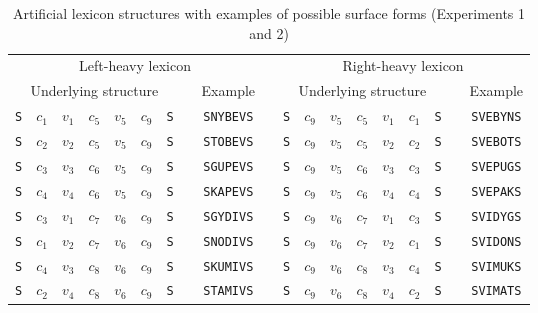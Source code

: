 \documentclass[doc,biblatex]{apa7}
\begin{document}
\begin{table}
\begin{center}
\begin{threeparttable}
\caption{Artificial lexicon structures with examples of possible surface forms (Experiments 1 and 2)}
\footnotesize
\label{table1}
\begin{tabular}{ccccccccccccccccccc}
\toprule
\multicolumn{9}{c}{Left-heavy lexicon} & & \multicolumn{9}{c}{Right-heavy lexicon} \\
\multicolumn{7}{c}{Underlying structure} & & Example & & \multicolumn{7}{c}{Underlying structure} & & Example \\
\texttt{S} & $c_1$ & $v_1$ & $c_5$ & $v_5$ & $c_9$ & \texttt{S} & & \texttt{SNYBEVS} & & \texttt{S} & $c_9$ & $v_5$ & $c_5$ & $v_1$ & $c_1$ & \texttt{S} & & \texttt{SVEBYNS} \\
\texttt{S} & $c_2$ & $v_2$ & $c_5$ & $v_5$ & $c_9$ & \texttt{S} & & \texttt{STOBEVS} & & \texttt{S} & $c_9$ & $v_5$ & $c_5$ & $v_2$ & $c_2$ & \texttt{S} & & \texttt{SVEBOTS} \\
\texttt{S} & $c_3$ & $v_3$ & $c_6$ & $v_5$ & $c_9$ & \texttt{S} & & \texttt{SGUPEVS} & & \texttt{S} & $c_9$ & $v_5$ & $c_6$ & $v_3$ & $c_3$ & \texttt{S} & & \texttt{SVEPUGS} \\
\texttt{S} & $c_4$ & $v_4$ & $c_6$ & $v_5$ & $c_9$ & \texttt{S} & & \texttt{SKAPEVS} & & \texttt{S} & $c_9$ & $v_5$ & $c_6$ & $v_4$ & $c_4$ & \texttt{S} & & \texttt{SVEPAKS} \\
\texttt{S} & $c_3$ & $v_1$ & $c_7$ & $v_6$ & $c_9$ & \texttt{S} & & \texttt{SGYDIVS} & & \texttt{S} & $c_9$ & $v_6$ & $c_7$ & $v_1$ & $c_3$ & \texttt{S} & & \texttt{SVIDYGS} \\
\texttt{S} & $c_1$ & $v_2$ & $c_7$ & $v_6$ & $c_9$ & \texttt{S} & & \texttt{SNODIVS} & & \texttt{S} & $c_9$ & $v_6$ & $c_7$ & $v_2$ & $c_1$ & \texttt{S} & & \texttt{SVIDONS} \\
\texttt{S} & $c_4$ & $v_3$ & $c_8$ & $v_6$ & $c_9$ & \texttt{S} & & \texttt{SKUMIVS} & & \texttt{S} & $c_9$ & $v_6$ & $c_8$ & $v_3$ & $c_4$ & \texttt{S} & & \texttt{SVIMUKS} \\
\texttt{S} & $c_2$ & $v_4$ & $c_8$ & $v_6$ & $c_9$ & \texttt{S} & & \texttt{STAMIVS} & & \texttt{S} & $c_9$ & $v_6$ & $c_8$ & $v_4$ & $c_2$ & \texttt{S} & & \texttt{SVIMATS} \\
\bottomrule
\end{tabular} 
\end{threeparttable}
\end{center} 
\end{table}
\end{document}
